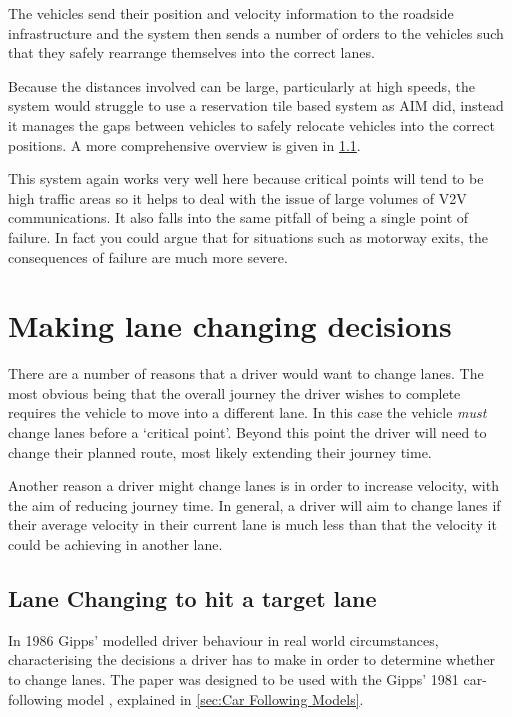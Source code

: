 The vehicles send their position and velocity information to the roadside infrastructure and the system then sends a number of orders to the vehicles such that they safely rearrange themselves into the correct lanes. 

Because the distances involved can be large, particularly at high speeds, the system would struggle to use a reservation tile based system as AIM did, instead it manages the gaps between vehicles to safely relocate vehicles into the correct positions. A more comprehensive overview is given in \ref{subsec:Lane Changing to hit a target lane}.

This system again works very well here because critical points will tend to be high traffic areas so it helps to deal with the issue of large volumes of V2V communications. It also falls into the same pitfall of being a single point of failure. In fact you could argue that for situations such as motorway exits, the consequences of failure are much more severe.

\section{Making lane changing decisions}
\label{sec:Making lane changing decisions}
There are a number of reasons that a driver would want to change lanes. The most obvious being that the overall journey the driver wishes to complete requires the vehicle to move into a different lane. In this case the vehicle \emph{must} change lanes before a `critical point'. Beyond this point the driver will need to change their planned route, most likely extending their journey time. 

Another reason a driver might change lanes is in order to increase velocity, with the aim of reducing journey time. In general, a driver will aim to change lanes if their average velocity in their current lane is much less than that the velocity it could be achieving in another lane.

\subsection{Lane Changing to hit a target lane}
\label{subsec:Lane Changing to hit a target lane}
In 1986 Gipps' modelled driver behaviour in real world circumstances, characterising the decisions a driver has to make in order to determine whether to change lanes. The paper was designed to be used with the Gipps' 1981 car-following model \citep{Gipps1981}, explained in \ref{sec:Car Following Models}.


